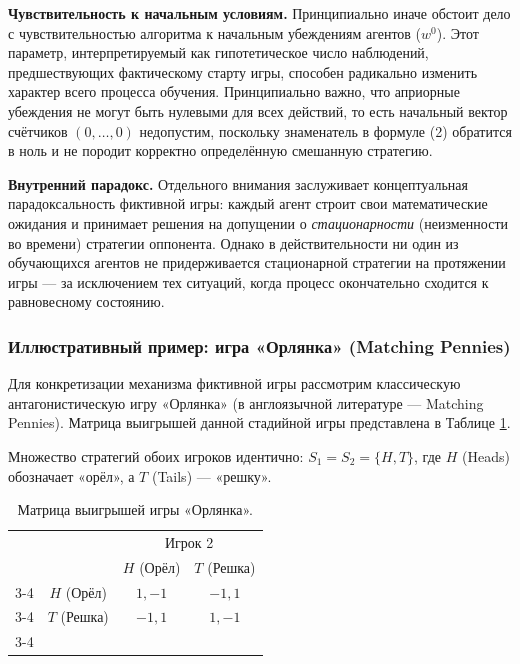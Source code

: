 \textbf{Чувствительность к начальным условиям.} 
Принципиально иначе обстоит дело с чувствительностью алгоритма к начальным убеждениям агентов ($w^0$). Этот параметр, интерпретируемый как гипотетическое число наблюдений, предшествующих фактическому старту игры, способен радикально изменить характер всего процесса обучения. Принципиально важно, что априорные убеждения не могут быть нулевыми для всех действий, то есть начальный вектор счётчиков $(0, \dots, 0)$ недопустим, поскольку знаменатель в формуле (2) обратится в ноль и не породит корректно определённую смешанную стратегию.

\textbf{Внутренний парадокс.} 
Отдельного внимания заслуживает концептуальная парадоксальность фиктивной игры: каждый агент строит свои математические ожидания и принимает решения на допущении о \textit{стационарности} (неизменности во времени) стратегии оппонента. Однако в действительности ни один из обучающихся агентов не придерживается стационарной стратегии на протяжении игры --- за исключением тех ситуаций, когда процесс окончательно сходится к равновесному состоянию.

\subsubsection{Иллюстративный пример: игра «Орлянка» (Matching Pennies)}

Для конкретизации механизма фиктивной игры рассмотрим классическую антагонистическую игру «Орлянка» (в англоязычной литературе --- Matching Pennies). Матрица выигрышей данной стадийной игры представлена в Таблице \ref{tab:matching_pennies_matrix}. 

Множество стратегий обоих игроков идентично: $S_1 = S_2 = \{H, T\}$, где $H$ (Heads) обозначает «орёл», а $T$ (Tails) --- «решку». 

\begin{table}[h]
\centering
\renewcommand{\arraystretch}{1.5}
\begin{tabular}{cc|c|c|}
& \multicolumn{1}{c}{} & \multicolumn{2}{c}{Игрок 2} \\
& \multicolumn{1}{c}{} & \multicolumn{1}{c}{$H$ (Орёл)} & \multicolumn{1}{c}{$T$ (Решка)} \\ \cline{3-4}
\multirow{2}{*}{Игрок 1} & $H$ (Орёл) & $1, -1$ & $-1, 1$ \\ \cline{3-4}
& $T$ (Решка) & $-1, 1$ & $1, -1$ \\ \cline{3-4}
\end{tabular}
\caption{Матрица выигрышей игры «Орлянка».}
\label{tab:matching_pennies_matrix}
\end{table}

